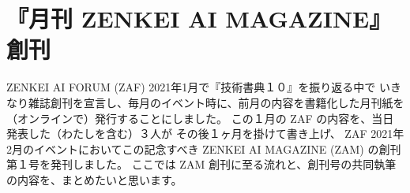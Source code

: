 \documentclass[dvipdfmx,autodetect-engine,10pt,b5paper,papersize,openany,dvipsnames]{jsbook}
\begin{document}
\newpage

\chapter{『月刊 ZENKEI AI MAGAZINE』創刊}
\label{ch:zam}


ZENKEI AI FORUM (ZAF) 2021年1月で『技術書典１０』を振り返る中で
いきなり雑誌創刊を宣言し、毎月のイベント時に、前月の内容を書籍化した月刊紙を
（オンラインで）発行することにしました。
この１月の ZAF の内容を、当日発表した（わたしを含む）３人が
その後１ヶ月を掛けて書き上げ、
ZAF 2021年2月のイベントにおいてこの記念すべき
ZENKEI AI MAGAZINE (ZAM) の創刊第１号を発刊しました。
ここでは ZAM 創刊に至る流れと、創刊号の共同執筆の内容を、まとめたいと思います。
\end{document}
